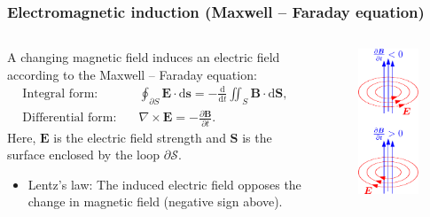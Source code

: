 \begin{frame}
	\frametitle{Electromagnetic induction (Maxwell -- Faraday equation)}
    \begin{columns}
		\begin{column}{0.6\textwidth}
            A changing magnetic field induces an electric field according to the Maxwell -- Faraday equation:
            \begin{align}
                \mbox{Integral form:} \quad & \oint_{\partial S} \bm{E} \cdot \mathrm{d}\bm{s} = -\frac{\mathrm{d}}{\mathrm{d}t}\iint_{S}\bm{B}\cdot\mathrm{d}\bm{S},\\
                \mbox{Differential form:} \quad &\nabla \times \bm{E} = -\frac{\partial \bm{B}}{\partial t}.
                \label{eq:induction_law}
            \end{align}
            Here, $\bm{E}$ is the electric field strength and $\bm{S}$ is the surface enclosed by the loop $\partial\mathcal{S}$.
            \begin{itemize}
                \item Lentz's law: The induced electric field opposes the change in magnetic field (negative sign above).
            \end{itemize}
		\end{column}
        \hfill
		\begin{column}{0.38\textwidth}
			\begin{figure}
				\centering
				\includegraphics[height=0.6\textheight]{fig/lec02/Electromagnetic_induction.pdf}

\end{figure}
\end{column}
\end{columns}
\end{frame}
